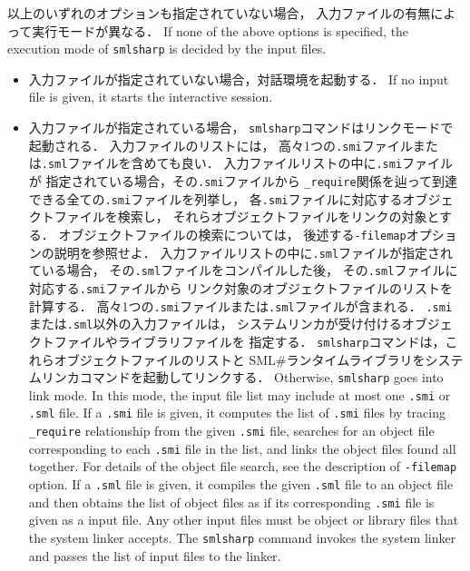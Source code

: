 \documentclass{jbook}
\newcommand{\smlsharp}{SML\#}
\begin{document}
\ifjp%
	以上のいずれのオプションも指定されていない場合，
入力ファイルの有無によって実行モードが異なる．
\else%
	If none of the above options is specified,
the execution mode of {\tt smlsharp} is decided by the input files.
\fi%
\begin{itemize}
\item
\ifjp%
	入力ファイルが指定されていない場合，対話環境を起動する．
\else%
	If no input file is given, it starts the interactive session.
\fi%

\item
\ifjp%
	入力ファイルが指定されている場合，
{\tt smlsharp}コマンドはリンクモードで起動される．
	入力ファイルのリストには，
高々1つの{\tt .smi}ファイルまたは{\tt .sml}ファイルを含めても良い．
	入力ファイルリストの中に{\tt .smi}ファイルが
指定されている場合，その{\tt .smi}ファイルから
{\tt \_require}関係を辿って到達できる全ての{\tt .smi}ファイルを列挙し，
各{\tt .smi}ファイルに対応するオブジェクトファイルを検索し，
それらオブジェクトファイルをリンクの対象とする．
	オブジェクトファイルの検索については，
後述する{\tt -filemap}オプションの説明を参照せよ．
	入力ファイルリストの中に{\tt .sml}ファイルが指定されている場合，
その{\tt .sml}ファイルをコンパイルした後，
その{\tt .sml}ファイルに対応する{\tt .smi}ファイルから
リンク対象のオブジェクトファイルのリストを計算する．
高々1つの{\tt .smi}ファイルまたは{\tt .sml}ファイルが含まれる．
	{\tt .smi}または{\tt .sml}以外の入力ファイルは，
システムリンカが受け付けるオブジェクトファイルやライブラリファイルを
指定する．
	{\tt smlsharp}コマンドは，これらオブジェクトファイルのリストと
\smlsharp{}ランタイムライブラリをシステムリンカコマンドを起動してリンクする．
\else%
	Otherwise, {\tt smlsharp} goes into link mode.
	In this mode,
the input file list may include at most one {\tt .smi} or {\tt .sml} file.
	If a {\tt .smi} file is given,
it computes the list of {\tt .smi} files by tracing {\tt \_require}
relationship from the given {\tt .smi} file,
searches for an object file corresponding to each {\tt .smi} file in the
list, and links the object files found all together.
	For details of the object file search,
see the description of {\tt -filemap} option.
	If a {\tt .sml} file is given,
it compiles the given {\tt .sml} file to an object file and then
obtains the list of object files as if its corresponding {\tt .smi} file
is given as a input file.
	Any other input files must be
object or library files that the system linker accepts.
	The {\tt smlsharp} command invokes the system linker and passes
the list of input files to the linker.
\fi%


\end{itemize}
\end{document}
